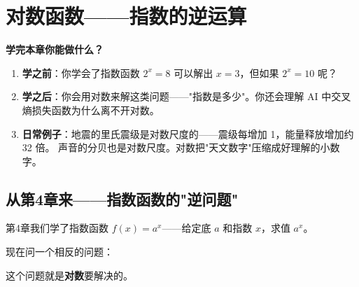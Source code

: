 
\chapter{对数函数——指数的逆运算}

\begin{applicationbox}
\textbf{学完本章你能做什么？}
\begin{enumerate}
  \item \textbf{学之前}：你学会了指数函数 \(2^x = 8\) 可以解出 \(x=3\)，但如果 \(2^x = 10\) 呢？
  \item \textbf{学之后}：你会用对数来解这类问题——"指数是多少"。你还会理解 AI 中交叉熵损失函数为什么离不开对数。
  \item \textbf{日常例子}：地震的里氏震级是对数尺度的——震级每增加 1，能量释放增加约 32 倍。
        声音的分贝也是对数尺度。对数把"天文数字"压缩成好理解的小数字。
\end{enumerate}
\end{applicationbox}


\section{从第4章来——指数函数的"逆问题"}

第4章我们学了指数函数 \(f(x) = a^x\)——给定底 \(a\) 和指数 \(x\)，求值 \(a^x\)。

现在问一个相反的问题：

\begin{center}
\end{center}

这个问题就是\textbf{对数}要解决的。

